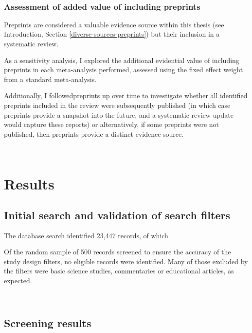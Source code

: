 \documentclass[a4paper, twoside]{templates/ociamthesis}
\begin{document}
~

\hypertarget{assessment-of-added-value-of-including-preprints}{%
\subsubsection{Assessment of added value of including preprints}\label{assessment-of-added-value-of-including-preprints}}

Preprints are considered a valuable evidence source within this thesis (see Introduction, Section \ref{diverse-sources-preprints}) but their inclusion in a systematic review.

As a sensitivity analysis, I explored the additional evidential value of including preprints in each meta-analysis performed, assessed using the fixed effect weight from a standard meta-analysis.

Additionally, I followedpreprints up over time to investigate whether all identified preprints included in the review were subsequently published (in which case preprints provide a snapshot into the future, and a systematic review update would capture these reports) or alternatively, if some preprints were not published, then preprints provide a distinct evidence source.

~

\hypertarget{results}{%
\section{Results}\label{results}}

\hypertarget{initial-search-and-validation-of-search-filters}{%
\subsection{Initial search and validation of search filters}\label{initial-search-and-validation-of-search-filters}}

The database search identified 23,447 records, of which

Of the random sample of 500 records screened to ensure the accuracy of the study design filters, no eligible records were identified. Many of those excluded by the filters were basic science studies, commentaries or educational articles, as expected.

~

\hypertarget{screening-results}{%
\subsection{Screening results}\label{screening-results}}
\end{document}
